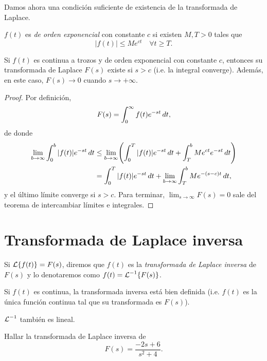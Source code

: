 \documentclass[../ecuaciones_diferenciales.tex]{subfiles}
\begin{document}
Damos ahora una condición suficiente de existencia de la transformada de Laplace.

\begin{definition}
	\(f(t)\) es \emph{de orden exponencial} con constante \(c\) si existen \(M, T
	> 0\) tales que
	\[|f(t)| \leq Me^{ct} \quad \forall t \geq T.\]
\end{definition}

\begin{theorem}
	Si \(f(t)\) es continua a trozos y de orden exponencial con constante \(c\),
	entonces su transformada de Laplace \(F(s)\) existe si \(s > c\) (i.e. la
	integral converge). Además, en este caso, \(F(s) \to 0\) cuando \(s \to +\infty\).
	\begin{proof}
		Por definición,
		\[F(s) = \int_0^\infty f(t)e^{-st} \mathop{d\!} t,\]
		de donde
		\begin{align*}
			\lim_{b \to \infty} \int_0^b |f(t)|e^{-st} \dif t
			 & \leq \lim_{b \to \infty} \left( \int_0^T |f(t)|e^{-st} \dif t
			+ \int_T^b Me^{ct}e^{-st} \dif t \right)                         \\
			 & = \int_0^T |f(t)|e^{-st} \dif t + \lim_{b \to \infty}
			\int_T^b Me^{-(s-c)t} \dif t,
		\end{align*}
		y el último límite converge si \(s>c\). Para terminar,
		\(\lim_{s \to \infty} F(s) = 0\) sale del teorema de intercambiar
		límites e integrales.
	\end{proof}
\end{theorem}

\section{Transformada de Laplace inversa}
Si \(\operatorname{\mathcal{L}}\{f(t)\} = F(s)\), diremos que \(f(t)\) es la \emph{transformada de
	Laplace inversa} de \(F(s)\) y lo denotaremos como \(f(t) = \operatorname{\mathcal{L}}^{-1}\{F(s)\}\).

\begin{remark}
	Si \(f(t)\) es continua, la transformada inversa está bien definida
	(i.e. \(f(t)\) es la única función continua tal que su transformada es \(F(s)\)).
\end{remark}

\begin{remark}
	\(\operatorname{\mathcal{L}}^{-1}\) también es lineal.
\end{remark}

\begin{example}
	Hallar la transformada de Laplace inversa de
	\[F(s) = \frac{-2s+6}{s^2+4}.\]
\end{example}
\end{document}
